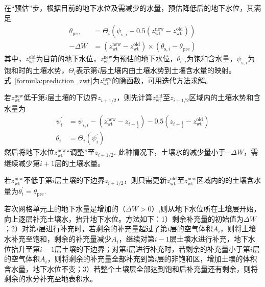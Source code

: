 在“预估”步，根据目前的地下水位及需减少的水量，预估降低后的地下水位，其满足
\begin{equation} \label{formula:prediction_zwt}
\begin{aligned}
\theta_{\mathrm{pre}} & = \Theta_i\left(\psi_{\mathrm{s},i} - 0.5\left(z_{\mathrm{wt}}^{\mathrm{new}} - z_{\mathrm{wt}}^{\mathrm{old}}\right)\right) \\
    - \Delta W & = \left(z_{\mathrm{wt}}^{\mathrm{new}} - z_{\mathrm{wt}}^{\mathrm{old}}\right) \times  \left(\theta_{\mathrm{s},i} - \theta_{\mathrm{pre}}\right)
\end{aligned}
\end{equation}
其中，$z_{\mathrm{wt}}^{\mathrm{old}}$为目前的地下水位，$z_{\mathrm{wt}}^{\mathrm{new}}$为预估的地下水位，$\theta_{\mathrm{s},i}$为饱和含水量，$\psi_{\mathrm{s},i}$为饱和时的土壤水势，$\Theta_i$表示第$i$层土壤内由土壤水势到土壤含水量的映射。式~\eqref{formula:prediction_zwt}为$z_{\mathrm{wt}}^{\mathrm{new}}$的隐函数，可用迭代方法求解。

若$z_{\mathrm{wt}}^{\mathrm{new}}$低于第$i$层土壤的下边界$z_{i+1/2}$，则先计算$z_{\mathrm{wt}}^{\mathrm{old}}$至$z_{i+1/2}$区域内的土壤水势和含水量为
\begin{equation} \label{formula:adjust_zwt1}
\begin{aligned}
\psi_i^{\prime} & = \psi_{\mathrm{s},i} - \left(z_{\mathrm{wt}}^{\mathrm{new}} - z_{i+\frac{1}{2}}\right) -0.5\left( z_{i+\frac{1}{2}} - z_{\mathrm{wt}}^{\mathrm{old}}\right) \\
\theta_i^{\prime} & = \Theta_i\left(\psi_i^{\prime}\right) 
\end{aligned}
\end{equation}
然后将地下水位$z_{\mathrm{wt}}^{\mathrm{new}}$“调整”至$z_{i+1/2}$. 此种情况下，土壤水的减少量小于$- \Delta W$，需继续减少第$i+1$层的土壤水量。

若$z_{\mathrm{wt}}^{\mathrm{new}}$不低于第$i$层土壤的下边界$z_{i+1/2}$，则只需更新$z_{\mathrm{wt}}^{\mathrm{old}}$至$z_{\mathrm{wt}}^{\mathrm{new}}$区域内的的土壤含水量为$\theta_i^{\prime} = \theta_{\mathrm{pre}}$.


若次网格单元上的地下水量是增加的（$\Delta W > 0$）,则从地下水位所在土壤层开始，向上逐层补充土壤水，抬升地下水位。方法如下：1）剩余补充量的初始值为$\Delta W$；2）对第$i$层进行补充时，若剩余的补充量超过了第$i$层的空气体积$A_i$，则将土壤水补充至饱和，剩余的补充量减少$A_i$，继续对第$i-1$层土壤水进行补充，地下水位抬升至第$i-1$层土壤的下边界；对第$i$层进行补充时，若剩余的补充量小于第$i$层的空气体积$A_i$，则将剩余的补充量全部补充到第$i$层的非饱和区，增加土壤的体积含水量，地下水位不变；3）若整个土壤层全部达到饱和后补充量还有剩余，则将剩余的水分补充至地表积水。



